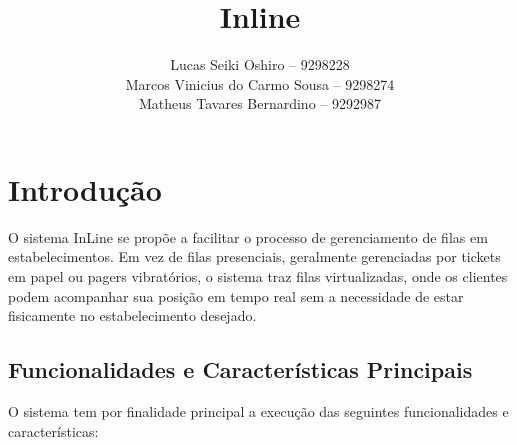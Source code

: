 \documentclass{book}
\title{Inline}
\author{Lucas Seiki Oshiro -- 9298228\\
  Marcos Vinicius do Carmo Sousa -- 9298274\\
  Matheus Tavares Bernardino -- 9292987\\}
\begin{document}
\maketitle
\tableofcontents

\chapter{Introdução}
O sistema InLine se propõe a facilitar o processo de gerenciamento de filas em
estabelecimentos. Em vez de filas presenciais, geralmente gerenciadas por
tickets em papel ou pagers vibratórios, o sistema traz filas virtualizadas, onde
os clientes podem acompanhar sua posição em tempo real sem a necessidade de
estar fisicamente no estabelecimento desejado.

\section{Funcionalidades e Características Principais}
O sistema tem por finalidade principal a execução das seguintes funcionalidades
e características:
\end{document}

